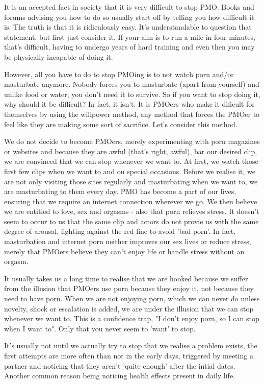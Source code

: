 \documentclass[easypeasy.tex]{subfiles}
\begin{document}
It is an accepted fact in society that it is very difficult to stop PMO. Books and forums advising you how to do so usually start off by telling you how difficult it is. The truth is that it is ridiculously easy. It's understandable to question that statement, but first just consider it. If your aim is to run a mile in four minutes, that's difficult, having to undergo years of hard training and even then you may be physically incapable of doing it.

However, all you have to do to stop PMOing is to not watch porn and/or masturbate anymore. Nobody forces you to masturbate (apart from yourself) and unlike food or water, you don't need it to survive. So if you want to stop doing it, why should it be difficult? In fact, it isn't. It is PMOers who make it dificult for themselves by using the willpower method, any method that forces the PMOer to feel like they are making some sort of sacrifice. Let's consider this method.

We do not decide to become PMOers, merely experimenting with porn magazines or websites and because they are awful (that's right, awful), bar our desired clip, we are convinced that we can stop whenever we want to. At first, we watch those first few clips when we want to and on special occasions. Before we realise it, we are not only visiting those sites regularly and masturbating when we want to, we are masturbating to them every day. PMO has become a part of our lives, ensuring that we require an internet connection wherever we go. We then believe we are entitled to love, sex and orgasms - also that porn relieves stress. It doesn't seem to occur to us that the same clip and actors do not provie us with the same degree of arousal, fighting against the red line to avoid 'bad porn'. In fact, masturbation and internet porn neither improves our sex lives or reduce stress, merely that PMOers believe they can't enjoy life or handle stress without an orgasm.

It usually takes us a long time to realise that we are hooked because we suffer from the illusion that PMOers use porn because they enjoy it, not because they need to have porn. When we are not enjoying porn, which we can never do unless novelty, shock or escalation is added, we are under the illusion that we can stop whenever we want to. This is a confidence trap, "I don't enjoy porn, so I can stop when I want to". Only that you never seem to 'want' to stop.

It's usually not until we actually try to stop that we realise a problem exists, the first attempts are more often than not in the early days, triggered by meeting a partner and noticing that they aren't 'quite enough' after the intial dates. Another common reason being noticing health effects present in daily life.
\end{document}
